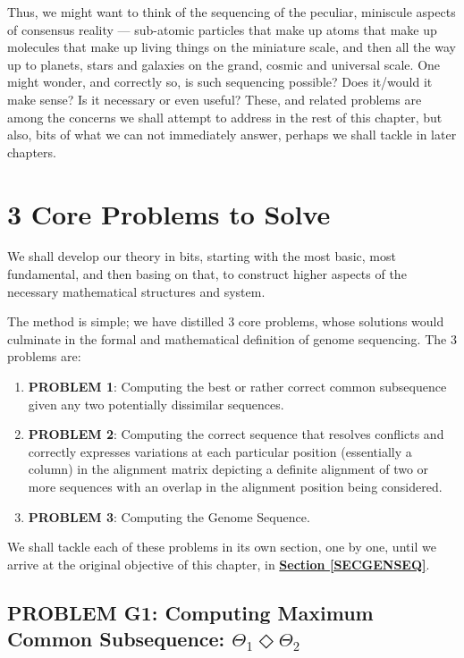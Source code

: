 \documentclass[a4paper, 18pt]{book} %
\begin{document}
Thus, we might want to think of the sequencing of the peculiar, miniscule aspects of consensus reality --- sub-atomic particles that make up atoms that make up molecules that make up living things on the miniature scale, and then all the way up to planets, stars and galaxies on the grand, cosmic and universal scale. One might wonder, and correctly so, is such sequencing possible? Does it/would it make sense? Is it necessary or even useful? These, and related problems are among the concerns we shall attempt to address in the rest of this chapter, but also, bits of what we can not immediately answer, perhaps we shall tackle in later chapters.

\section{3 Core Problems to Solve}
\label{SEC3COREPROB}

We shall develop our theory in bits, starting with the most basic, most fundamental, and then basing on that, to construct higher aspects of the necessary mathematical structures and system.

The method is simple; we have distilled 3 core problems, whose solutions would culminate in the formal and mathematical definition of genome sequencing. The 3 problems are:


\begin{enumerate}
\item \textbf{PROBLEM 1}: Computing the best or rather correct common subsequence given any two potentially dissimilar sequences.
\item \textbf{PROBLEM 2}: Computing the correct sequence that resolves conflicts and correctly expresses variations at each particular position (essentially a column) in the alignment matrix depicting a definite alignment of two or more sequences with an overlap in the alignment position being considered.
\item \textbf{PROBLEM 3}: Computing the Genome Sequence.
\end{enumerate}

We shall tackle each of these problems in its own section, one by one, until we arrive at the original objective of this chapter, in \textbf{\hyperref[SECGENSEQ]{Section \ref{SECGENSEQ}}}.

\subsection{PROBLEM G1: Computing Maximum Common Subsequence: $\Theta_1 \Diamond \Theta_2$}
\label{PROBG1}
\end{document}
